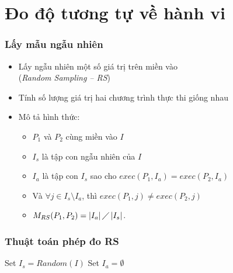 \documentclass{beamer}
\begin{document}
\section{Đo độ tương tự về hành vi}
\begin{frame}
  \frametitle{Lấy mẫu ngẫu nhiên}
  	
  \begin{itemize}  	
  	\item Lấy ngẫu nhiên một số giá trị trên miền vào \\(\emph{Random
  		Sampling -- RS})
  	\item Tính số lượng giá trị hai chương trình
  	thực thi giống nhau
  	\item Mô tả hình thức:
  	\begin{itemize}
  		\item $P_{1}$ và $P_{2}$ cùng miền vào $I$
  		\item $I_{s}$ là tập con ngẫu nhiên của $I$
  		\item $I_{a}$ là tập con
  		$I_{s}$ sao cho $exec(P_{1}, I_a) = exec(P_{2}, I_a)$
  		\item Và $\forall j \in I_{s} \setminus I_{a}$, thì
  		$exec(P_{1}, j) \neq exec(P_{2}, j)$
  		\item $M_{RS}(P_{1}, P_{2}) = \left|I_{a}\right| \diagup
  		\left|I_{s}\right| $.
  	\end{itemize}
  \end{itemize}
\end{frame}


\begin{frame}
  \frametitle{Thuật toán phép đo RS}
  \begin{algorithm}[H]
	Set $I_{s} = Random(I)$ \;
	Set $I_{a} = \emptyset$\;
  	{  			
  	}
  \end{algorithm}
\end{frame}
\end{document}

